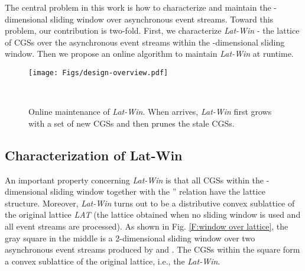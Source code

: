 \documentclass[12pt,journal,letterpaper,compsoc]{IEEEtran}
\begin{document}
The central problem in this work is how to characterize and maintain the -dimensional sliding window over asynchronous event streams. Toward this problem, our contribution is two-fold. First, we characterize {\it Lat-Win} - the lattice of CGSs over the asynchronous event streams within the -dimensional sliding window. Then we propose an online algorithm to maintain {\it Lat-Win} at runtime.
\begin{figure}[htbp]
        \begin{minipage}[b]{1\textwidth}
        \centering
        \texttt{[image: Figs/design-overview.pdf]}
        \end{minipage}\\
    \hspace*{\fill}
    \hspace*{\fill}
    \caption{Online maintenance of {\it Lat-Win}. When  arrives, {\it Lat-Win} first grows with a set of new CGSs and then prunes the stale CGSs.}
    \label{F:design overview}
\end{figure}

\subsection{Characterization of Lat-Win}


An important property concerning {\it Lat-Win} is that all CGSs within the -dimensional sliding window together with the '' relation have the lattice structure. Moreover, {\it Lat-Win} turns out to be a distributive convex sublattice of the original lattice {\it LAT} (the lattice obtained when no sliding window is used and all event streams are processed). As shown in Fig. \ref{F:window over lattice}, the gray square in the middle is a 2-dimensional sliding window over two asynchronous event streams produced by  and . The CGSs within the square form a convex sublattice of the original lattice, i.e., the {\it Lat-Win}.
\end{document}
